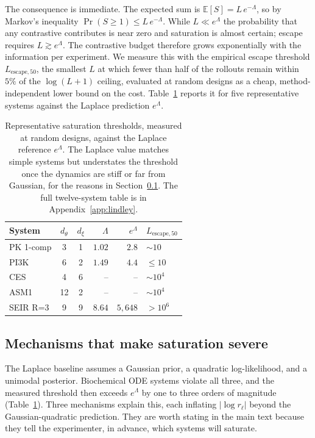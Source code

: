 The consequence is immediate. The expected sum is $\mathbb{E}[S]=L\,e^{-\Lambda}$, so
by Markov's inequality $\Pr(S\ge1)\le L\,e^{-\Lambda}$. While $L\ll e^{\Lambda}$ the
probability that any contrastive contributes is near zero and saturation is almost
certain; escape requires $L\gtrsim e^{\Lambda}$. The contrastive budget therefore
grows exponentially with the information per experiment. We measure this with the
empirical escape threshold $L_{\mathrm{escape},50}$, the smallest $L$ at which fewer
than half of the rollouts remain within $5\%$ of the $\log(L+1)$ ceiling, evaluated
at random designs as a cheap, method-independent lower bound on the cost.
Table~\ref{tab:escape} reports it for five representative systems against the Laplace
prediction $e^{\Lambda}$.

\begin{table}[t]
\centering\small
\caption[Representative saturation thresholds]{Representative saturation thresholds,
measured at random designs, against the Laplace reference $e^{\Lambda}$. The Laplace
value matches simple systems but understates the threshold once the dynamics are
stiff or far from Gaussian, for the reasons in Section~\ref{sec:m-mechanisms}. The
full twelve-system table is in Appendix~\ref{app:lindley}.}
\label{tab:escape}
\begin{tabular}{lccrrl}
\toprule
System & $d_\theta$ & $d_\xi$ & $\Lambda$ & $e^{\Lambda}$ & $L_{\mathrm{escape},50}$ \\
\midrule
PK 1-comp & 3 & 1 & $1.02$ & $2.8$ & ${\sim}10$ \\
PI3K      & 6 & 2 & $1.49$ & $4.4$ & ${\le}10$ \\
CES       & 4 & 6 & --     & --    & ${\sim}10^4$ \\
ASM1      & 12 & 2 & --    & --    & ${\sim}10^4$ \\
SEIR R=3  & 9 & 9 & $8.64$ & $5{,}648$ & ${>}10^6$ \\
\bottomrule
\end{tabular}
\end{table}

\subsection{Mechanisms that make saturation severe}
\label{sec:m-mechanisms}

The Laplace baseline assumes a Gaussian prior, a quadratic log-likelihood, and a
unimodal posterior. Biochemical ODE systems violate all three, and the measured
threshold then exceeds $e^{\Lambda}$ by one to three orders of magnitude
(Table~\ref{tab:escape}). Three mechanisms explain this, each inflating $|\log r_\ell|$
beyond the Gaussian-quadratic prediction. They are worth stating in the main text
because they tell the experimenter, in advance, which systems will saturate.

